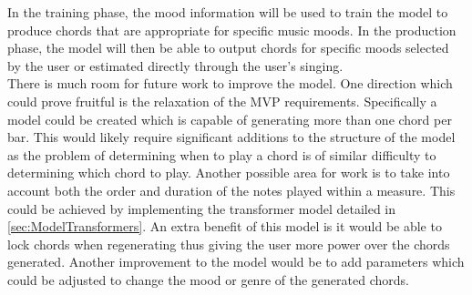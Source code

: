 In the training phase, the mood information will be used to train the model to produce chords that are appropriate for specific music moods. 
In the production phase, the model will then be able to output chords for specific moods selected by the user or estimated directly through the user's singing.
\\
There is much room for future work to improve the model.
One direction which could prove fruitful is the relaxation of the MVP requirements. 
Specifically a model could be created which is capable of generating more than one chord per bar.
This would likely require significant additions to the structure of the model as the problem of determining when to play a chord is of similar difficulty to determining which chord to play.
Another possible area for work is to take into account both the order and duration of the notes played within a measure.
This could be achieved by implementing the transformer model detailed in \cref{sec:ModelTransformers}.
An extra benefit of this model is it would be able to lock chords when regenerating thus giving the user more power over the chords generated.
Another improvement to the model would be to add parameters which could be adjusted to change the mood or genre of the generated chords.
\\

